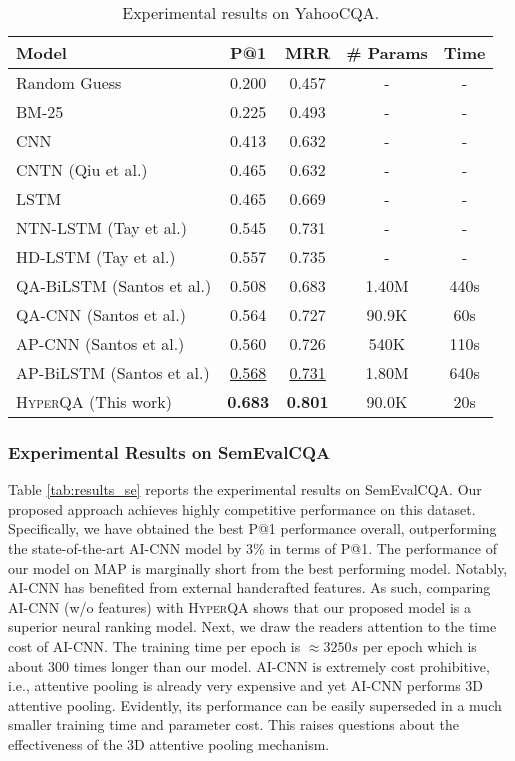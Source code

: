 \documentclass[sigconf]{acmart}
\begin{document}
\begin{table}[ht]
  \centering
\small
    \begin{tabular}{lcccc}
    \hline
          
         Model & P@1   & MRR   & \# Params & Time \\
          \hline
    Random Guess & 0.200 & 0.457 & -      & - \\
    BM-25 & 0.225 & 0.493 &  -     & - \\

    CNN  & 0.413 & 0.632 &  -     & - \\
    CNTN (Qiu et al.)  & 0.465 & 0.632 & -      & - \\
    LSTM & 0.465 & 0.669 &  -     & - \\
    NTN-LSTM (Tay et al.)  & 0.545 & 0.731 & -     & - \\
    HD-LSTM (Tay et al.)  & 0.557 & 0.735 & -      & - \\

    QA-BiLSTM (Santos et al.)& 0.508 &0.683 &1.40M & 440s \\
    QA-CNN (Santos et al.) & 0.564& 0.727&  90.9K & 60s \\
    AP-CNN (Santos et al.) & 0.560& 0.726& 540K & 110s \\
    AP-BiLSTM (Santos et al.) & \underline{0.568}& \underline{0.731}& 1.80M& 640s \\
\hline
    \textsc{HyperQA} (This work) & \textbf{0.683} & \textbf{0.801} & 90.0K   & 20s \\
    \hline
    \end{tabular}\caption{Experimental results on YahooCQA.}
  \label{tab:yahooQAresults}\end{table}


\subsubsection{Experimental Results on SemEvalCQA}
Table \ref{tab:results_se} reports the experimental results on SemEvalCQA. Our proposed approach achieves highly competitive performance on this dataset. Specifically, we have obtained the best P@1 performance overall, outperforming
the state-of-the-art AI-CNN  model by $3\%$ in terms of P@1. The performance of our model on MAP is marginally short from the best performing model. Notably, AI-CNN has benefited from external handcrafted features. As such, comparing AI-CNN (w/o features) with \textsc{HyperQA} shows that our proposed model is a superior neural ranking model. Next, we draw the readers attention to the time cost of AI-CNN. The training time per epoch is $\approx 3250s$ per epoch which is about $300$ times longer than our model. AI-CNN is extremely cost prohibitive, i.e., attentive pooling is already very expensive and yet AI-CNN performs 3D attentive pooling. Evidently, its performance can be easily superseded in a much smaller training time and parameter cost. This raises questions about the effectiveness of the 3D attentive pooling mechanism.
\end{document}
